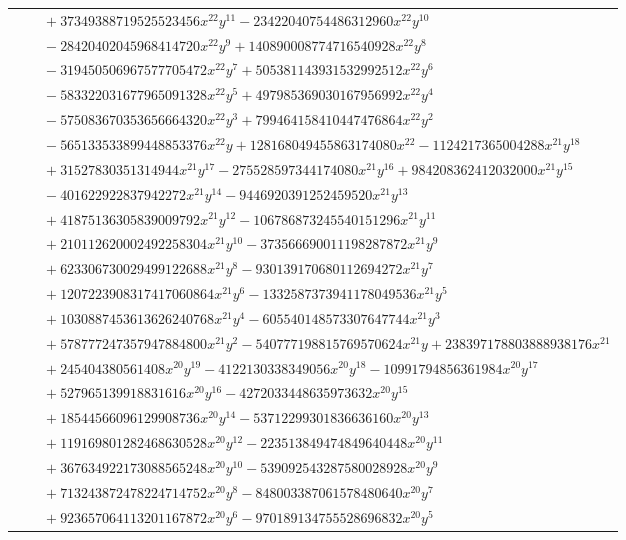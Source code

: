 \documentclass[11pt]{article}
\begin{document}
\begin{longtable}{@{}ll@{}}
 & $\quad +37349388719525523456x^{22}y^{11}-23422040754486312960x^{22}y^{10}$\\
 & $\quad -28420402045968414720x^{22}y^{9}+140890008774716540928x^{22}y^{8}$\\
 & $\quad -319450506967577705472x^{22}y^{7}+505381143931532992512x^{22}y^{6}$\\
 & $\quad -583322031677965091328x^{22}y^{5}+497985369030167956992x^{22}y^{4}$\\
 & $\quad -575083670353656664320x^{22}y^{3}+799464158410447476864x^{22}y^{2}$\\
 & $\quad -565133533899448853376x^{22}y+128168049455863174080x^{22}-1124217365004288x^{21}y^{18}$\\
 & $\quad +31527830351314944x^{21}y^{17}-275528597344174080x^{21}y^{16}+984208362412032000x^{21}y^{15}$\\
 & $\quad -401622922837942272x^{21}y^{14}-9446920391252459520x^{21}y^{13}$\\
 & $\quad +41875136305839009792x^{21}y^{12}-106786873245540151296x^{21}y^{11}$\\
 & $\quad +210112620002492258304x^{21}y^{10}-373566690011198287872x^{21}y^{9}$\\
 & $\quad +623306730029499122688x^{21}y^{8}-930139170680112694272x^{21}y^{7}$\\
 & $\quad +1207223908317417060864x^{21}y^{6}-1332587373941178049536x^{21}y^{5}$\\
 & $\quad +1030887453613626240768x^{21}y^{4}-605540148573307647744x^{21}y^{3}$\\
 & $\quad +578777247357947884800x^{21}y^{2}-540777198815769570624x^{21}y+238397178803888938176x^{21}$\\
 & $\quad +245404380561408x^{20}y^{19}-4122130338349056x^{20}y^{18}-10991794856361984x^{20}y^{17}$\\
 & $\quad +527965139918831616x^{20}y^{16}-4272033448635973632x^{20}y^{15}$\\
 & $\quad +18544566096129908736x^{20}y^{14}-53712299301836636160x^{20}y^{13}$\\
 & $\quad +119169801282468630528x^{20}y^{12}-223513849474849640448x^{20}y^{11}$\\
 & $\quad +367634922173088565248x^{20}y^{10}-539092543287580028928x^{20}y^{9}$\\
 & $\quad +713243872478224714752x^{20}y^{8}-848003387061578480640x^{20}y^{7}$\\
 & $\quad +923657064113201167872x^{20}y^{6}-970189134755528696832x^{20}y^{5}$\\

\end{longtable}
\end{document}
